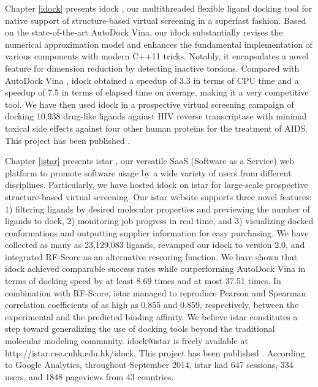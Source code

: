 Chapter \ref{idock} presents idock \citep{1153}, our multithreaded flexible ligand docking tool for native support of structure-based virtual screening in a superfast fashion. Based on the state-of-the-art AutoDock Vina, our idock substantially revises the numerical approximation model and enhances the fundamental implementation of various components with modern C++11 tricks. Notably, it encapsulates a novel feature for dimension reduction by detecting inactive torsions. Compared with AutoDock Vina \citep{595}, idock obtained a speedup of 3.3 in terms of CPU time and a speedup of 7.5 in terms of elapsed time on average, making it a very competitive tool. We have then used idock in a prospective virtual screening campaign of docking 10,938 drug-like ligands against HIV reverse transcriptase with minimal toxical side effects against four other human proteins for the treatment of AIDS. This project has been published \citep{1153}.

Chapter \ref{istar} presents istar \citep{1362}, our versatile SaaS (Software as a Service) web platform to promote software usage by a wide variety of users from different disciplines. Particularly, we have hosted idock on istar for large-scale prospective structure-based virtual screening. Our istar website supports three novel features: 1) filtering ligands by desired molecular properties and previewing the number of ligands to dock, 2) monitoring job progress in real time, and 3) visualizing docked conformations and outputting supplier information for easy purchasing. We have collected as many as 23,129,083 ligands, revamped our idock to version 2.0, and integrated RF-Score \citep{564} as an alternative rescoring function. We have shown that idock achieved comparable success rates while outperforming AutoDock Vina in terms of docking speed by at least 8.69 times and at most 37.51 times. In combination with RF-Score, istar managed to reproduce Pearson and Spearman correlation coefficients of as high as 0.855 and 0.859, respectively, between the experimental and the predicted binding affinity. We believe istar constitutes a step toward generalizing the use of docking tools beyond the traditional molecular modeling community. idock@istar is freely available at http://istar.cse.cuhk.edu.hk/idock. This project has been published \citep{1362}. According to Google Analytics, throughout September 2014, istar had 647 sessions, 334 users, and 1848 pageviews from 43 countries.


